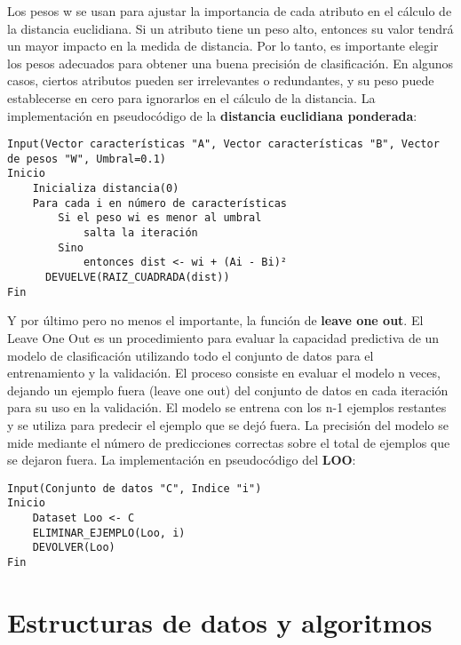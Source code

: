 Los pesos w se usan para ajustar la importancia de cada atributo en el cálculo de la distancia euclidiana. Si un atributo tiene un peso alto, entonces su valor tendrá un mayor impacto en la medida de distancia. Por lo tanto, es importante elegir los pesos adecuados para obtener una buena precisión de clasificación. En algunos casos, ciertos atributos pueden ser irrelevantes o redundantes, y su peso puede establecerse en cero para ignorarlos en el cálculo de la distancia. La implementación en pseudocódigo de la \textbf{distancia euclidiana ponderada}:

\begin{verbatim}
Input(Vector características "A", Vector características "B", Vector de pesos "W", Umbral=0.1)
Inicio
    Inicializa distancia(0)
    Para cada i en número de características
        Si el peso wi es menor al umbral
            salta la iteración
        Sino
            entonces dist <- wi + (Ai - Bi)²
      DEVUELVE(RAIZ_CUADRADA(dist))
Fin
\end{verbatim}

Y por último pero no menos el importante, la función de \textbf{leave one out}. El Leave One Out es un procedimiento para evaluar la capacidad predictiva de un modelo de clasificación utilizando todo el conjunto de datos para el entrenamiento y la validación. El proceso consiste en evaluar el modelo n veces, dejando un ejemplo fuera (leave one out) del conjunto de datos en cada iteración para su uso en la validación. El modelo se entrena con los n-1 ejemplos restantes y se utiliza para predecir el ejemplo que se dejó fuera. La precisión del modelo se mide mediante el número de predicciones correctas sobre el total de ejemplos que se dejaron fuera. La implementación en pseudocódigo del \textbf{LOO}:

\begin{verbatim}
Input(Conjunto de datos "C", Indice "i")
Inicio
    Dataset Loo <- C
    ELIMINAR_EJEMPLO(Loo, i)
    DEVOLVER(Loo)
Fin
\end{verbatim}


\section{Estructuras de datos y algoritmos}
